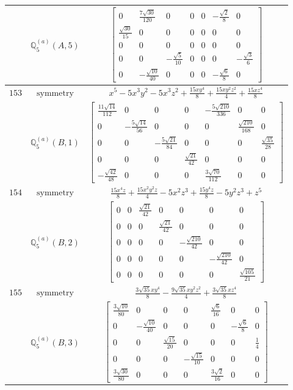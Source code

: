 \documentclass[fleqn,8pt,landscape]{jsarticle}
\begin{document}
\begin{longtable}{ccc}
$  $ & $ \mathbb{Q}_{5}^{(a)}(A,5) $ & $ \begin{bmatrix} 0 & \frac{7 \sqrt{30}}{120} & 0 & 0 & 0 & - \frac{\sqrt{2}}{8} & 0 \\ \frac{\sqrt{30}}{15} & 0 & 0 & 0 & 0 & 0 & 0 \\ 0 & 0 & 0 & 0 & 0 & 0 & 0 \\ 0 & 0 & - \frac{\sqrt{5}}{10} & 0 & 0 & 0 & - \frac{\sqrt{3}}{6} \\ 0 & - \frac{\sqrt{10}}{40} & 0 & 0 & 0 & - \frac{\sqrt{6}}{8} & 0 \end{bmatrix} $ \\ \hline
$ 153 $ & $ \text{symmetry} $ & $ x^{5} - 5 x^{3} y^{2} - 5 x^{3} z^{2} + \frac{15 x y^{4}}{8} + \frac{15 x y^{2} z^{2}}{4} + \frac{15 x z^{4}}{8} $ \\
$  $ & $ \mathbb{Q}_{5}^{(a)}(B,1) $ & $ \begin{bmatrix} \frac{11 \sqrt{14}}{112} & 0 & 0 & 0 & - \frac{5 \sqrt{210}}{336} & 0 & 0 \\ 0 & - \frac{5 \sqrt{14}}{56} & 0 & 0 & 0 & \frac{\sqrt{210}}{168} & 0 \\ 0 & 0 & - \frac{5 \sqrt{21}}{84} & 0 & 0 & 0 & \frac{\sqrt{35}}{28} \\ 0 & 0 & 0 & \frac{\sqrt{21}}{42} & 0 & 0 & 0 \\ - \frac{\sqrt{42}}{48} & 0 & 0 & 0 & \frac{3 \sqrt{70}}{112} & 0 & 0 \end{bmatrix} $ \\ \hline
$ 154 $ & $ \text{symmetry} $ & $ \frac{15 x^{4} z}{8} + \frac{15 x^{2} y^{2} z}{4} - 5 x^{2} z^{3} + \frac{15 y^{4} z}{8} - 5 y^{2} z^{3} + z^{5} $ \\
$  $ & $ \mathbb{Q}_{5}^{(a)}(B,2) $ & $ \begin{bmatrix} 0 & 0 & \frac{\sqrt{21}}{42} & 0 & 0 & 0 & 0 \\ 0 & 0 & 0 & \frac{\sqrt{21}}{42} & 0 & 0 & 0 \\ 0 & 0 & 0 & 0 & - \frac{\sqrt{210}}{42} & 0 & 0 \\ 0 & 0 & 0 & 0 & 0 & - \frac{\sqrt{210}}{42} & 0 \\ 0 & 0 & 0 & 0 & 0 & 0 & \frac{\sqrt{105}}{21} \end{bmatrix} $ \\ \hline
$ 155 $ & $ \text{symmetry} $ & $ \frac{3 \sqrt{35} x y^{4}}{8} - \frac{9 \sqrt{35} x y^{2} z^{2}}{4} + \frac{3 \sqrt{35} x z^{4}}{8} $ \\
$  $ & $ \mathbb{Q}_{5}^{(a)}(B,3) $ & $ \begin{bmatrix} \frac{3 \sqrt{10}}{80} & 0 & 0 & 0 & \frac{\sqrt{6}}{16} & 0 & 0 \\ 0 & - \frac{\sqrt{10}}{40} & 0 & 0 & 0 & - \frac{\sqrt{6}}{8} & 0 \\ 0 & 0 & \frac{\sqrt{15}}{20} & 0 & 0 & 0 & \frac{1}{4} \\ 0 & 0 & 0 & - \frac{\sqrt{15}}{10} & 0 & 0 & 0 \\ \frac{3 \sqrt{30}}{80} & 0 & 0 & 0 & \frac{3 \sqrt{2}}{16} & 0 & 0 \end{bmatrix} $ \\ \hline

\end{longtable}
\end{document}
